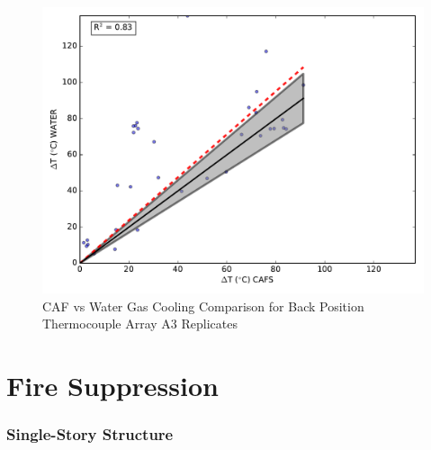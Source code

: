 \documentclass[12pt,oneside]{book}
\begin{document}
\begin{figure}[!ht]
	\includegraphics[width=.7\columnwidth]{../Figures/Gas_Cooling/Combined_fullback_A3_scatter}
	\caption{CAF vs Water Gas Cooling Comparison for Back Position Thermocouple Array A3 Replicates}
	\label{fig:CAFS_Water_A3_back}
\end{figure}


\clearpage

\section{Fire Suppression}
\label{sec:Fire_Suppression}

\subsubsection*{Single-Story Structure}
\label{sec:fire_supp_single}
\end{document}
